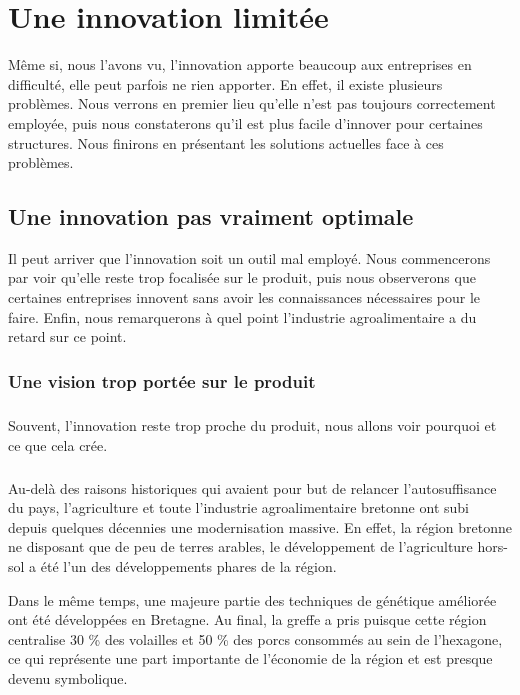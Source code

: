 \documentclass[a4paper,12pt]{report}
\begin{document}
\chapter{Une innovation limitée}
	Même si, nous l'avons vu, l'innovation apporte beaucoup aux entreprises en difficulté, elle peut parfois ne rien apporter. En effet, il existe plusieurs problèmes. Nous verrons en premier lieu qu'elle n'est pas toujours correctement employée, puis nous constaterons qu'il est plus facile d'innover pour certaines structures. Nous finirons en présentant les solutions actuelles face à ces problèmes.

	\section{Une innovation pas vraiment optimale}
	Il peut arriver que l'innovation soit un outil mal employé. Nous commencerons par voir qu'elle reste trop focalisée sur le produit, puis nous observerons que certaines entreprises innovent sans avoir les connaissances nécessaires pour le faire. Enfin, nous remarquerons à quel point l'industrie agroalimentaire a du retard sur ce point.
	
		\subsection{Une vision trop portée sur le produit}
		\paragraph{}Souvent, l'innovation reste trop proche du produit, nous allons voir pourquoi et ce que cela crée.
		
			\paragraph{}Au-delà des raisons historiques qui avaient pour but de relancer l’autosuffisance du pays, l’agriculture et toute l’industrie agroalimentaire bretonne ont subi depuis quelques décennies une modernisation massive. En effet, la région bretonne ne disposant que de peu de terres arables, le développement de l’agriculture hors-sol a été l’un des développements phares de la région. 
			
			Dans le même temps, une majeure partie des techniques de génétique améliorée ont été développées en Bretagne. Au final, la greffe a pris puisque cette région centralise 30 \% des volailles et 50 \% des porcs consommés au sein de l’hexagone, ce qui représente une part importante de l’économie de la région et est presque devenu symbolique.
			
\end{document}

